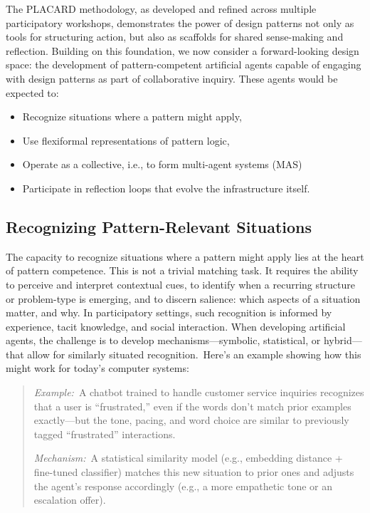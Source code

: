 \documentclass[acmlarge,timestamp]{acmart}
\providecommand{\tightlist}{%
  \setlength{\itemsep}{0pt}\setlength{\parskip}{0pt}}
\begin{document}
The PLACARD methodology, as developed and refined across multiple
participatory workshops, demonstrates the power of design patterns not
only as tools for structuring action, but also as scaffolds for shared
sense-making and reflection. Building on this foundation, we now
consider a forward-looking design space: the development of
pattern-competent artificial agents capable of engaging with design
patterns as part of collaborative inquiry.  These agents would be
expected to:

\begin{itemize}
\tightlist
\item
  {Recognize situations where a pattern might apply,}
\item
  {Use flexiformal representations of pattern logic,}
\item
  {Operate as a collective, i.e., to form multi-agent systems (MAS)}
\item
  {Participate in reflection loops that evolve the infrastructure
  itself.}
\end{itemize}

\subsection{Recognizing Pattern-Relevant Situations}

{The capacity to recognize situations where a pattern might apply lies
at the heart of pattern competence. This is not a trivial matching task.
It requires the ability to perceive and interpret contextual cues, to
identify when a recurring structure or problem-type is emerging, and to
discern salience: which aspects of a situation matter, and why. In
participatory settings, such recognition is informed by experience,
tacit knowledge, and social interaction. When developing artificial
agents, the challenge is to develop mechanisms---symbolic, statistical,
or hybrid---that allow }{for similarly situated recognition.}{~Here's an
example showing how this might work for today's computer systems:}

\begin{quote}
\emph{Example:}~{A chatbot trained to handle customer service inquiries
recognizes that a user is ``frustrated,'' even if the words don't match
prior examples exactly---but the tone, pacing, and word choice are
similar to previously tagged ``frustrated'' interactions.}

\emph{Mechanism:}{~A statistical similarity model (e.g., embedding distance +
fine-tuned classifier) matches this new situation to prior ones and
adjusts the agent's response accordingly (e.g., a more empathetic tone or
an escalation offer).}
\end{quote}
\end{document}
